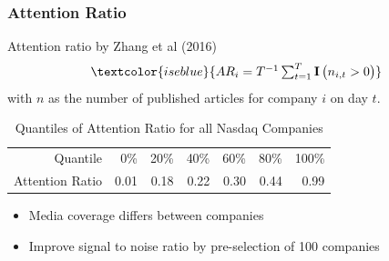 \begin{frame}
\frametitle{Attention Ratio}

Attention ratio by \textcolor{iseblue}{Zhang et al (2016)} \\
\begin{equation}
\textcolor{iseblue}{
AR_{i} = \textstyle T^{-1} \sum_{t=1}^T{\operatorname{\mathbf{I}}\big( n_{i, t} > 0 \big) }
}
\end{equation}
with $n$ as the number of published articles for company $i$ on day $t$.
\vspace{10pt}
\begin{table}[ht]
\centering
\begin{tabular}{r|rrrrrr}
  \hline
  \hline
Quantile & 0\% & 20\% & 40\% & 60\% & 80\% & 100\% \\ 
Attention Ratio & 0.01 & 0.18 & 0.22 & 0.30 & 0.44 & 0.99 \\ 
   \hline
  \hline
\end{tabular}
    \caption{Quantiles of Attention Ratio for all Nasdaq Companies}
    \label{tab:ar_total}
\end{table}
\vspace{-25pt}
\begin{itemize}
    \item Media coverage differs between companies
    \item Improve signal to noise ratio by pre-selection of 100 companies

\end{itemize}
\end{frame}

